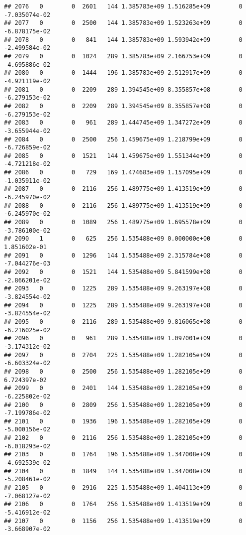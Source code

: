 \documentclass[
]{article}
\begin{document}
\begin{enumerate}
\begin{verbatim}
## 2076   0        0  2601   144 1.385783e+09 1.516285e+09        0 -7.035074e-02
## 2077   0        0  2500   144 1.385783e+09 1.523263e+09        0 -6.878175e-02
## 2078   0        0   841   144 1.385783e+09 1.593942e+09        0 -2.499584e-02
## 2079   0        0  1024   289 1.385783e+09 2.166753e+09        0 -4.695886e-02
## 2080   0        0  1444   196 1.385783e+09 2.512917e+09        0 -4.921119e-02
## 2081   0        0  2209   289 1.394545e+09 8.355857e+08        0 -6.279153e-02
## 2082   0        0  2209   289 1.394545e+09 8.355857e+08        0 -6.279153e-02
## 2083   0        0   961   289 1.444745e+09 1.347272e+09        0 -3.655944e-02
## 2084   0        0  2500   256 1.459675e+09 1.218799e+09        0 -6.726859e-02
## 2085   0        0  1521   144 1.459675e+09 1.551344e+09        0 -4.721218e-02
## 2086   0        0   729   169 1.474683e+09 1.157095e+09        0 -1.035911e-02
## 2087   0        0  2116   256 1.489775e+09 1.413519e+09        0 -6.245970e-02
## 2088   0        0  2116   256 1.489775e+09 1.413519e+09        0 -6.245970e-02
## 2089   0        0  1089   256 1.489775e+09 1.695578e+09        0 -3.786100e-02
## 2090   1        0   625   256 1.535488e+09 0.000000e+00        0  1.851602e-01
## 2091   0        0  1296   144 1.535488e+09 2.315784e+08        0 -7.044276e-03
## 2092   0        0  1521   144 1.535488e+09 5.841599e+08        0 -2.866201e-02
## 2093   0        0  1225   289 1.535488e+09 9.263197e+08        0 -3.824554e-02
## 2094   0        0  1225   289 1.535488e+09 9.263197e+08        0 -3.824554e-02
## 2095   0        0  2116   289 1.535488e+09 9.816065e+08        0 -6.216025e-02
## 2096   0        0   961   289 1.535488e+09 1.097001e+09        0 -3.174312e-02
## 2097   0        0  2704   225 1.535488e+09 1.282105e+09        0 -6.603324e-02
## 2098   0        0  2500   256 1.535488e+09 1.282105e+09        0  6.724397e-02
## 2099   0        0  2401   144 1.535488e+09 1.282105e+09        0 -6.225802e-02
## 2100   0        0  2809   256 1.535488e+09 1.282105e+09        0 -7.199786e-02
## 2101   0        0  1936   196 1.535488e+09 1.282105e+09        0 -5.000156e-02
## 2102   0        0  2116   256 1.535488e+09 1.282105e+09        0 -6.018293e-02
## 2103   0        0  1764   196 1.535488e+09 1.347008e+09        0 -4.692539e-02
## 2104   0        0  1849   144 1.535488e+09 1.347008e+09        0 -5.208461e-02
## 2105   0        0  2916   225 1.535488e+09 1.404113e+09        0 -7.068127e-02
## 2106   0        0  1764   256 1.535488e+09 1.413519e+09        0 -5.416912e-02
## 2107   0        0  1156   256 1.535488e+09 1.413519e+09        0 -3.668907e-02

\end{verbatim}
\end{enumerate}
\end{document}
